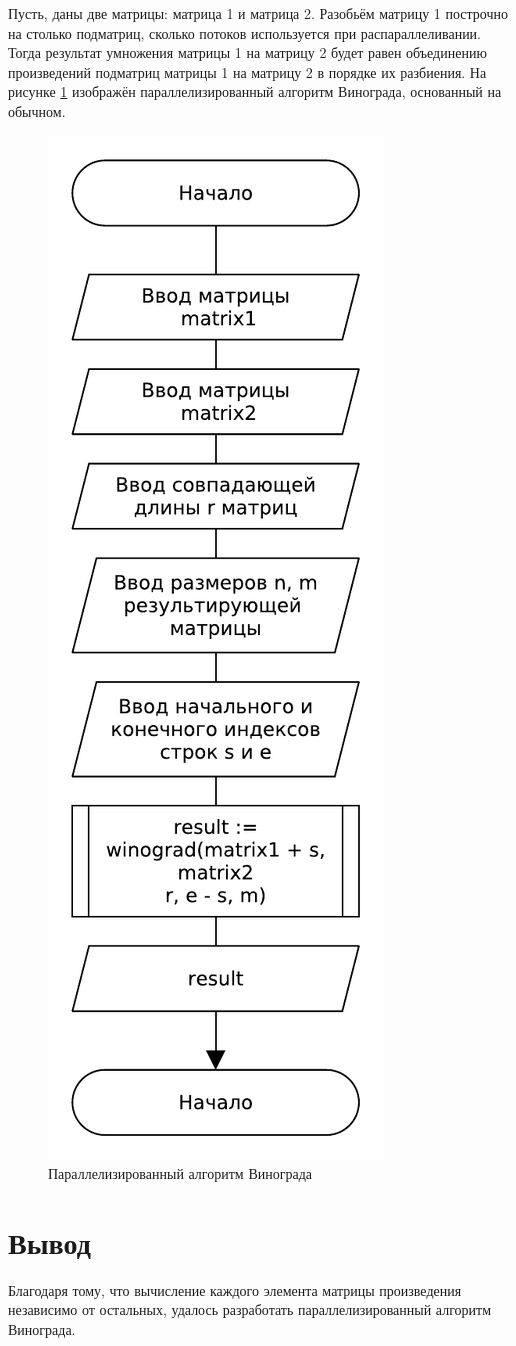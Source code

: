 Пусть, даны две матрицы: матрица 1 и матрица 2. Разобьём матрицу 1 построчно на столько подматриц, сколько потоков используется при распараллеливании. Тогда результат умножения матрицы 1 на матрицу 2 будет равен объединению произведений подматриц матрицы 1 на матрицу 2 в порядке их разбиения. На рисунке \ref{img:pwindograd} изображён параллелизированный алгоритм Винограда, основанный на обычном.
\begin{figure}[H]
    \centering
    \includegraphics[scale=0.70]{pdf/pwinograd.pdf}
    \caption{Параллелизированный алгоритм Винограда}
    \label{img:pwindograd}
\end{figure}

\section{Вывод}
Благодаря тому, что вычисление каждого элемента матрицы произведения независимо от остальных, удалось разработать параллелизированный алгоритм Винограда.

